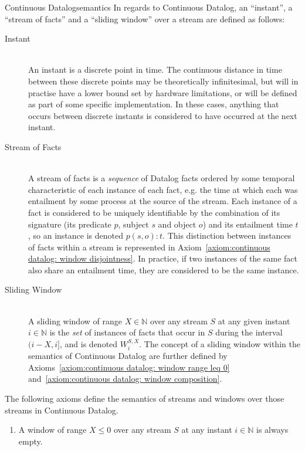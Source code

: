 \begin{nestedsection}{Continuous Datalog}{semantics}
	In regards to Continuous Datalog, an ``instant'', a ``stream of facts'' and a ``sliding window'' over a stream are defined as follows:
	\begin{description}
		\item[Instant\label{def:continuous datalog: instant}]\hfill\\
			An instant is a discrete point in time.
			The continuous distance in time between these discrete points may be theoretically infinitesimal, but will in practise have a lower bound set by hardware limitations, or will be defined as part of some specific implementation.
			In these cases, anything that occurs between discrete instants is considered to have occurred at the next instant.
		\item[Stream of Facts\label{def:continuous datalog: stream}]\hfill\\
			A stream of facts is a \emph{sequence} of Datalog facts ordered by some temporal characteristic of each instance of each fact, e.g. the time at which each was entailment by some process at the source of the stream.
			Each instance of a fact is considered to be uniquely identifiable by the combination of its signature (its predicate $p$, subject $s$ and object $o$) and its entailment time $t$, so an instance is denoted ${p(s,o):t}$.
			This distinction between instances of facts within a stream is represented in Axiom~\ref{axiom:continuous datalog: window disjointness}.
			In practice, if two instances of the same fact also share an entailment time, they are considered to be the same instance.
		\item[Sliding Window\label{def:continuous datalog: window}]\hfill\\
			A sliding window of range ${X \in \mathbb{N}}$ over any stream $S$ at any given instant ${i \in \mathbb{N}}$ is the \emph{set} of instances of facts that occur in $S$ during the interval ${(i-X,i]}$, and is denoted ${W^{S,X}_{i}}$.
			The concept of a sliding window within the semantics of Continuous Datalog are further defined by Axioms~\ref{axiom:continuous datalog: window range leq 0} and~\ref{axiom:continuous datalog: window composition}.
	\end{description}
	The following axioms define the semantics of streams and windows over those streams in Continuous Datalog.
	\begin{enumerate}
		\item\label{axiom:continuous datalog: window range leq 0}
			A window of range ${X \leq 0}$ over any stream $S$ at any instant ${i \in \mathbb{N}}$ is always empty.

\end{enumerate}
\end{nestedsection}
